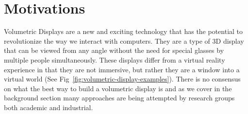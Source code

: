 \section{Motivations}

Volumetric Displays are a new and exciting technology that has the potential to revolutionize the way we interact with computers. They are a type of 3D display that can be viewed from any angle without the need for special glasses by multiple people simultaneously. \cite{1492264} These displays differ from a virtual reality experience in that they are not immersive, but rather they are a window into a virtual world (See Fig~\ref{fig:volumetric-display-examples}). There is no consensus on what the best way to build a volumetric display is and as we cover in the background section many approaches are being attempted by research groups both academic and industrial.

